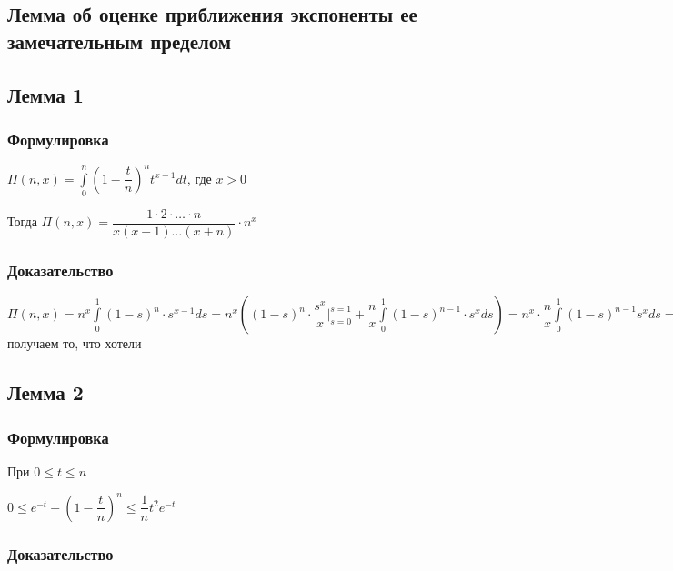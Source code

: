 \documentclass[../main.tex]{subfiles}
\begin{document}
\subsection{Лемма об оценке приближения экспоненты ее замечательным пределом}
\subsection*{Лемма 1}
        
            \subsubsection*{Формулировка}
            
                $\Pi(n, x) = \int\limits^n_0 \left(1 - \dfrac{t}{n} \right)^n t^{x - 1} dt$, где $x > 0$
                
                Тогда $\Pi(n, x) = \dfrac{1 \cdot 2 \cdot \ldots \cdot n}{x(x + 1)\ldots(x+n)} \cdot n^x$
                
            \subsubsection*{Доказательство}
            
                $\Pi(n, x) = n^x \int\limits^1_0 (1 - s)^n \cdot s^{x - 1} ds = n^x \left(  (1 - s)^n \cdot \dfrac{s^x}{x} \bigg|^{s = 1}_{s = 0} + \dfrac{n}{x} \int\limits^1_0 (1 - s)^{n - 1} \cdot s^x ds \right) = n^x \cdot \dfrac{n}{x} \int\limits^1_0 (1 - s)^{n - 1} s^x ds = n^x \cdot \dfrac{n}{x} \cdot \dfrac{n - 1}{x + 1} \cdot \int\limits^1_0 (1 - s)^{n - 2} s^{x - 1} ds = \ldots$ получаем то, что хотели
                
        \subsection*{Лемма 2}
        
            \subsubsection*{Формулировка}
            
                При $0 \leq t \leq n$ 
                
                $0 \leq e^{-t} - \left(1 - \dfrac{t}{n} \right)^n \leq \dfrac{1}{n} t^2 e^{-t}$
                
            \subsubsection*{Доказательство}
            
\end{document}
